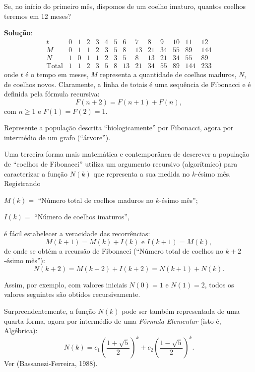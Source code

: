 \begin{exercise}
Se, no início do primeiro mês, dispomos de um coelho imaturo, quantos coelhos teremos em 12 meses?
\end{exercise}

{\color{red} \textbf{Solução}:
{\scriptsize
\[\begin{array}{cccccccccccccc}
t & 0 & 1 & 2 & 3 & 4 & 5 & 6 & 7 & 8 & 9 & 10 & 11 & 12 \\
M & 0 & 1 & 1 & 2 & 3 & 5 & 8 & 13 & 21 & 34 & 55 & 89 & 144 \\
N & 1 & 0 & 1 & 1 & 2 & 3 & 5 & 8 & 13 & 21 & 34 & 55 & 89 \\
\mbox{Total} & 1 & 1 & 2 & 3 & 5 & 8 & 13 & 21 & 34 & 55 & 89 & 144 & 233
\end{array}\]
}
onde \(t\) é o tempo em meses, \(M\) representa a quantidade de coelhos maduros, \(N\), de coelhos novos. Claramente, a linha de totais é uma sequência de Fibonacci e é definida pela fórmula recursiva:
\[F(n+2)=F(n+1)+F(n),\]
com \(n \ge 1\)  e \(F(1) = F(2) = 1.\)
}


\begin{exercise}
Represente a população descrita ``biologicamente'' por Fibonacci, agora por intermédio de um grafo (``árvore'').
\end{exercise}


    Uma terceira forma mais matemática e contemporânea de descrever a população de ``coelhos de Fibonacci'' utiliza um argumento recursivo (algorítmico) para caracterizar a função \(N(k)\) que representa a sua medida no \(k\)-ésimo mês. Registrando
    \begin{description}
    \item \(M(k) = \) ``Número total de coelhos maduros no \(k\)-ésimo mês'';
    \item \(I(k) = \) ``Número de coelhos imaturos'',
    \end{description}
    é fácil estabelecer a veracidade das recorrências:
    \[M(k+1) = M(k) + I(k) \mbox{ e } I(k+1) = M(k),\]
    de onde se obtém a recursão de Fibonacci (``Número total de coelhos no \(k+2\)-ésimo mês''):
    \[N(k+2) = M(k+2) + I(k+2) = N(k+1) + N(k).\]

    Assim, por exemplo, com valores iniciais \(N(0) = 1\) e \(N(1) = 2\), todos os valores seguintes são obtidos recursivamente.

    Surpreendentemente, a função \(N(k)\) pode ser também representada de uma quarta forma, agora por intermédio de uma \textit{Fórmula Elementar} (isto é, Algébrica):
    \[N(k) = c_1 \left(\dfrac{1+\sqrt{5}}{2}\right)^k + c_2 \left(\dfrac{1-\sqrt{5}}{2}\right)^k.\]
    Ver (Bassanezi-Ferreira, 1988).

